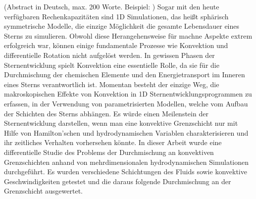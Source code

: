 (Abstract in Deutsch, max. 200 Worte. Beispiel: \cite{loremIpsum})
Sogar mit den heute verfügbaren Rechenkapazitäten sind 1D Simulationen, das heißt sphärisch symmetrische Modelle, die einzige Möglichkeit die gesamte Lebensdauer eines Sterns zu simulieren. Obwohl diese Herangehensweise für machne Aspekte extrem erfolgreich war, können einige fundamentale Prozesse wie Konvektion und differentielle Rotation nicht aufgelöst werden. In gewissen Phasen der Sternentwicklung spielt Konvektion eine essentielle Rolle, da sie für die Durchmischung der chemischen Elemente und den Energietransport im Inneren eines Sterns verantwortlich ist. Momentan besteht der einzige Weg, die makroskopischen Effekte von Konvektion in 1D Sternentwicklungsprogrammen zu erfassen, in der Verwendung von parametrisierten Modellen, welche vom Aufbau der Schichten des Sterns abhängen. Es würde einen Meilenstein der Sternentwicklung darstellen, wenn man eine konvektive Grenzschicht nur mit Hilfe von Hamilton'schen und hydrodynamischen Variablen charakterisieren und ihr zeitliches Verhalten vorhersehen könnte. In dieser Arbeit wurde eine differentielle Studie des Problems der Durchmischung an konvektiven Grenzschichten anhand von mehrdimensionalen hydrodynamischen Simulationen durchgeführt. Es wurden verschiedene Schichtungen des Fluids sowie konvektive Geschwindigkeiten getestet und die daraus folgende Durchmischung an der Grenzschicht ausgewertet.
